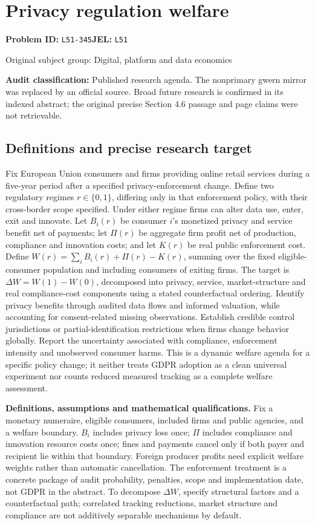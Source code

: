 \documentclass[11pt,a4paper]{article}
\begin{document}
\section*{Privacy regulation welfare}
\textbf{Problem ID:} \texttt{L51-345}\quad \textbf{JEL:} \texttt{L51}\par
\label{problem:OP-0408}
{\sffamily\small\color{muted}Original subject group: Digital, platform and data economics\par}
\label{definitions:problem:30007690}
\textbf{Audit classification:} Published research agenda. The nonprimary gwern mirror was replaced by an official source. Broad future research is confirmed in its indexed abstract; the original precise Section 4.6 passage and page claims were not retrievable.
\subsection*{Definitions and precise research target}
Fix European Union consumers and firms providing online retail services during a five-year period after a specified privacy-enforcement change. Define two regulatory regimes \(r\in\{0,1\}\), differing only in that enforcement policy, with their cross-border scope specified. Under either regime firms can alter data use, enter, exit and innovate. Let \(B_i(r)\) be consumer \(i\)'s monetized privacy and service benefit net of payments; let \(\Pi(r)\) be aggregate firm profit net of production, compliance and innovation costs; and let \(K(r)\) be real public enforcement cost. Define \(W(r)=\sum_i B_i(r)+\Pi(r)-K(r)\), summing over the fixed eligible-consumer population and including consumers of exiting firms. The target is \(\Delta W=W(1)-W(0)\), decomposed into privacy, service, market-structure and real compliance-cost components using a stated counterfactual ordering. Identify privacy benefits through audited data flows and informed valuation, while accounting for consent-related missing observations. Establish credible control jurisdictions or partial-identification restrictions when firms change behavior globally. Report the uncertainty associated with compliance, enforcement intensity and unobserved consumer harms. This is a dynamic welfare agenda for a specific policy change; it neither treats GDPR adoption as a clean universal experiment nor counts reduced measured tracking as a complete welfare assessment.

\textbf{Definitions, assumptions and mathematical qualifications.} Fix a monetary numeraire, eligible consumers, included firms and public agencies, and a welfare boundary. \(B_i\) includes privacy loss once; \(\Pi\) includes compliance and innovation resource costs once; fines and payments cancel only if both payer and recipient lie within that boundary. Foreign producer profits need explicit welfare weights rather than automatic cancellation. The enforcement treatment is a concrete package of audit probability, penalties, scope and implementation date, not GDPR in the abstract. To decompose \(\Delta W\), specify structural factors and a counterfactual path; correlated tracking reductions, market structure and compliance are not additively separable mechanisms by default.
\end{document}
